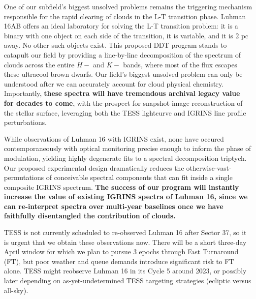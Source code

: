 \documentclass[11pt]{article}
\begin{document}
{One of our subfield's biggest unsolved problems remains the triggering mechanism responsible for the rapid clearing of clouds in the L-T transition phase.  Luhman 16AB offers an ideal laboratory for solving the L-T transition problem: it is a binary with one object on each side of the transition, it is variable, and it is 2 pc away. No other such objects exist. This proposed DDT program stands to catapult our field by providing a line-by-line decomposition of the spectrum of clouds across the entire $H-$ and $K-$ bands, where most of the flux escapes these ultracool brown dwarfs.  Our field's biggest unsolved problem can only be understood after we can accurately account for cloud physical chemistry.  Importantly, \textbf{these spectra will have tremendous archival legacy value for decades to come}, with the prospect for snapshot image reconstruction of the stellar surface, leveraging both the TESS lightcurve and IGRINS line profile perturbations.



While observations of Luhman 16 with IGRINS exist, none have occured contemporaneously with optical monitoring precise enough to inform the phase of modulation, yielding highly degenerate fits to a spectral decomposition triptych.  Our proposed experimental design dramatically reduces the otherwise-vast-permutations of conceivable spectral components that can fit inside a single composite IGRINS spectrum.  \textbf{The success of our program will instantly increase the value of existing IGRINS spectra of Luhman 16, since we can re-interpret spectra over multi-year baselines once we have faithfully disentangled the contribution of clouds.}

TESS is not currently scheduled to re-observed Luhman 16 after Sector 37, so it is urgent that we obtain these observations now.  There will be a short three-day April window for which we plan to pursue 3 epochs through Fast Turnaround (FT), but poor weather and queue demands introduce significant risk to FT alone.  TESS might reobserve Luhman 16 in its Cycle 5 around 2023, or possibly later depending on as-yet-undetermined TESS targeting strategies (ecliptic versus all-sky).

}
\end{document}
